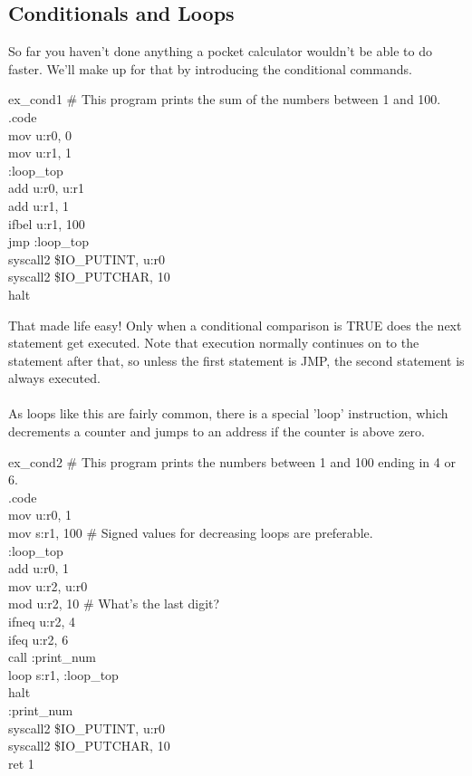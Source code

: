 \documentclass[a4paper,oneside,openany]{book}
\begin{document}
\subsection{Conditionals and Loops}
So far you haven't done anything a pocket calculator wouldn't be able to do faster. We'll make up for that by introducing the conditional commands.
\begin{codefile}{ex\_cond1}
\# This program prints the sum of the numbers between 1 and 100.\\
.code\\
\>	mov u:r0, 0\\
\>	mov u:r1, 1\\
:loop\_top\\
\>	add u:r0, u:r1\\
\>	add u:r1, 1\\
\>	ifbel u:r1, 100\\
\>	jmp :loop\_top\\
\>	syscall2 \$IO\_PUTINT, u:r0\\
\>	syscall2 \$IO\_PUTCHAR, 10\\
\>	halt
\end{codefile}
That made life easy! Only when a conditional comparison is TRUE does the next statement
get executed. Note that execution normally continues on to the statement after that, so
unless the first statement is JMP, the second statement is always executed.\\
\\
As loops like this are fairly common, there is a special 'loop' instruction, which
decrements a counter and jumps to an address if the counter is above zero.
\begin{codefile}{ex\_cond2}
\# This program prints the numbers between 1 and 100 ending in 4 or 6.\\
.code\\
\>	mov u:r0, 1\\
\>	mov s:r1, 100 \# Signed values for decreasing loops are preferable.\\
:loop\_top\\
\>	add u:r0, 1\\
\>	mov u:r2, u:r0\\
\>	mod u:r2, 10 \# What's the last digit? \\
\>	ifneq u:r2, 4\\
\>	ifeq u:r2, 6\\
\>	call :print\_num\\
\>	loop s:r1, :loop\_top\\
\>	halt\\
:print\_num\\
\>	syscall2 \$IO\_PUTINT, u:r0\\
\>	syscall2 \$IO\_PUTCHAR, 10\\
\>	ret 1
\end{codefile}
\end{document}
